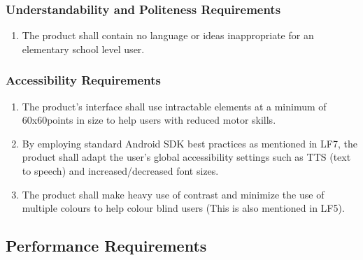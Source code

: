\documentclass[]{article}
\begin{document}
\subsubsection{Understandability and Politeness Requirements}
\label{ssub:understandability_and_politeness_requirements}

\begin{enumerate}[{UH}1. ]
 	\resumeEnum
	\item The product shall contain no language or ideas inappropriate for an elementary school level user.
	\holdEnum
\end{enumerate}

\subsubsection{Accessibility Requirements}
\label{ssub:accessibility_requirements}
\begin{enumerate}[{UH}1. ]
	\resumeEnum
	\item The product's interface shall use intractable elements at a minimum of 60x60points in size to help users with reduced motor skills.
	\item By employing standard Android SDK best practices as mentioned in LF7, the product shall adapt the user's global accessibility settings such as TTS (text to speech) and increased/decreased font sizes. 
	\item The product shall make heavy use of contrast and minimize the use of multiple colours to help colour blind users (This is also mentioned in LF5).
\end{enumerate}


\subsection{Performance Requirements}
\label{sub:performance_requirements}
\end{document}
